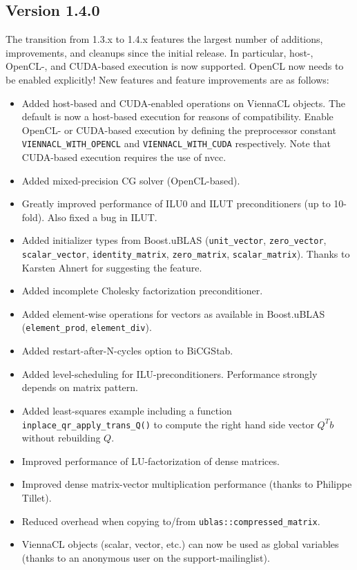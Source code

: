 \subsection*{Version 1.4.0}
The transition from 1.3.x to 1.4.x features the largest number of additions, improvements, and cleanups since the initial release.
In particular, host-, OpenCL-, and CUDA-based execution is now supported. OpenCL now needs to be enabled explicitly!
New features and feature improvements are as follows:
\begin{itemize}
 \item Added host-based and CUDA-enabled operations on ViennaCL objects. The default is now a host-based execution for reasons of compatibility.
       Enable OpenCL- or CUDA-based execution by defining the preprocessor constant \lstinline|VIENNACL_WITH_OPENCL| and \lstinline|VIENNACL_WITH_CUDA| respectively.
       Note that CUDA-based execution requires the use of nvcc.
 \item Added mixed-precision CG solver (OpenCL-based).
 \item Greatly improved performance of ILU0 and ILUT preconditioners (up to 10-fold). Also fixed a bug in ILUT.
 \item Added initializer types from Boost.uBLAS (\lstinline|unit_vector|, \lstinline|zero_vector|, \lstinline|scalar_vector|, \lstinline|identity_matrix|, \lstinline|zero_matrix|, \lstinline|scalar_matrix|).
       Thanks to Karsten Ahnert for suggesting the feature.
 \item Added incomplete Cholesky factorization preconditioner.
 \item Added element-wise operations for vectors as available in Boost.uBLAS (\lstinline|element_prod|, \lstinline|element_div|).
 \item Added restart-after-N-cycles option to BiCGStab.
 \item Added level-scheduling for ILU-preconditioners. Performance strongly depends on matrix pattern.
 \item Added least-squares example including a function \lstinline|inplace_qr_apply_trans_Q()| to compute the right hand side vector $Q^T b$ without rebuilding $Q$.
 \item Improved performance of LU-factorization of dense matrices.
 \item Improved dense matrix-vector multiplication performance (thanks to Philippe Tillet).
 \item Reduced overhead when copying to/from \lstinline|ublas::compressed_matrix|.
 \item ViennaCL objects (scalar, vector, etc.) can now be used as global variables (thanks to an anonymous user on the support-mailinglist).

\end{itemize}
